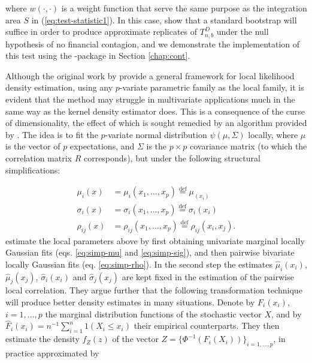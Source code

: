 where $w(\cdot, \cdot)$ is a weight function that serve the same purpose as the integration area $S$ in (\ref{eq:test-statistic1}). In this case, \citet{stov:tjos:huft:2014} show that a standard bootstrap will suffice in order to produce approximate replicates of $T_{n,b}^D$ under the null hypothesis of no financial contagion, and we demonstrate the implementation of this test using the -package in Section \ref{chap:cont}.

Although the original work by \citet{hjor:jone:1996} provide a general framework for local likelihood density estimation, using any $p$-variate parametric family as the local family, it is evident that the method may struggle in multivariate applications much in the same way as the kernel density estimator does. This is a consequence of the curse of dimensionality, the effect of which is sought remedied by an algorithm provided by \citet{otne:tjos:2017}. The idea is to fit the $p$-variate normal distribution $\psi(\mu, \Sigma)$ locally, where $\mu$ is the vector of $p$ expectations, and $\Sigma$ is the $p\times p$ covariance matrix (to which the correlation matrix $R$ corresponds), but under the following structural simplifications:

\begin{align}
\mu_i(x) &= \mu_i(x_1, \ldots, x_p) \stackrel{\textrm{def}}{=} \mu_(x_i) \label{eq:simp-mu}\\
\sigma_i(x) &= \sigma_i(x_1, \ldots, x_p)  \stackrel{\textrm{def}}{=} \sigma_i(x_i) \label{eq:simp-sig} \\
\rho_{ij}(x) &= \rho_{ij}(x_1, \ldots, x_p) \stackrel{\textrm{def}}{=} \rho_{ij}(x_i, x_j). \label{eq:simp-rho}
\end{align}
\citet{otne:tjos:2017} estimate the local parameters above by first obtaining univariate marginal locally Gaussian fits (eqs. \ref{eq:simp-mu} and \ref{eq:simp-sig}), and then pairwise bivariate locally Gaussian fits (eq. \ref{eq:simp-rho}). In the second step the estimates $\widehat\mu_i(x_i)$, $\widehat\mu_j(x_j)$, $\widehat\sigma_i(x_i)$ and $\widehat\sigma_j(x_j)$ are kept fixed in the estimation of the pairwise local correlation. They argue further that the following transformation technique will produce better density estimates in many situations. Denote by $F_i(x_i)$, $i = 1,\ldots, p$ the marginal distribution functions of the stochastic vector $X$, and by $\widehat F_i(x_i) = n^{-1}\sum_{i=1}^n 1(X_i \leq x_i)$ their empirical counterparts. They then estimate the density $f_Z(z)$ of the vector $Z = \{\Phi^{-1}(F_i(X_i))\}_{i=1,\ldots,p}$, in practice approximated by 


